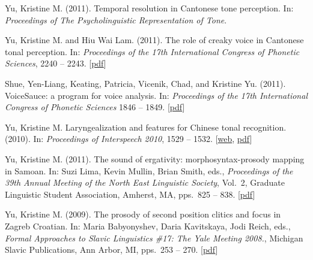 \documentclass[10pt]{article}
\begin{document}
\begin{bibenum}

    \item Yu, Kristine M. (2011). Temporal resolution in {C}antonese tone
      perception. In: \emph{Proceedings of The Psycholinguistic Representation of Tone}.

    \item Yu, Kristine M. and Hiu Wai Lam. (2011). The role of creaky
      voice in {C}antonese tonal perception. In: \emph{Proceedings of the
        17th International Congress of Phonetic Sciences},
      2240 -- 2243. [\href{http://www.icphs2011.hk/resources/OnlineProceedings/RegularSession/Yu,%20Kristine/Yu,%20Kristine.pdf}{pdf}] 

    \item Shue, Yen-Liang, Keating, Patricia, Vicenik, Chad, and Kristine
      Yu. (2011). VoiceSauce: a program for voice analysis. In:
      \emph{Proceedings of the 17th International Congress of Phonetic
        Sciences}
      1846 -- 1849. [\href{http://www.icphs2011.hk/resources/OnlineProceedings/RegularSessio
        n/Shue/Shue.pdf}{pdf}]

    \item Yu, Kristine M. Laryngealization and features for Chinese
      tonal recognition. (2010). In: \emph{Proceedings of Interspeech 2010},
      1529 --
      1532. [\href{http://www.isca-speech.org/archive/interspeech_2010/i10_1529.html}{web}, \href{http://www.krisy.org/output/yu2010-interspeech-laryngealization.pdf}{pdf}]

    \item Yu, Kristine M. (2011). The sound of ergativity:
      morphosyntax-prosody mapping in Samoan. In: Suzi Lima, Kevin
      Mullin, Brian Smith, eds., \emph{Proceedings of the 39th Annual
      Meeting of the North East Linguistic Society}, Vol.\ 2, Graduate
    Linguistic Student Association, Amherst,
    MA, pps.\ 825 -- 838. [\href{http://www.krisyu.org/output/yu2011-nels39-samoan.pdf}{pdf}]

    \item Yu, Kristine M. (2009). The prosody of second position
      clitics and focus in Zagreb Croatian. In: Maria Babyonyshev,
      Daria Kavitskaya, Jodi Reich, eds., \emph{Formal Approaches to Slavic Linguistics \#17: 
The Yale Meeting 2008.}, Michigan Slavic Publications, Ann Arbor, MI,
pps.\ 253 -- 270. [\href{http://www.krisyu.org/yu2009-fasl17-croatian-2pc.pdf}{pdf}]  

\end{bibenum}
\end{document}
